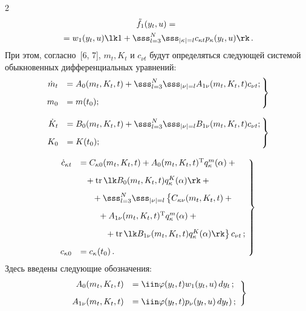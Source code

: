 \begin{multicols}{2}
\noindent
\begin{multline}
\tilde f_1 (y_t, u) ={}\\
{}= w_1 (y_t,u) \lk 1+ \sss_{l=3}^N \sss_{\left\vert\kappa\right\vert=l} 
c_{\kappa t} p_\kappa (y_t,u)\rk\,.\label{e13s}
\end{multline}
При этом, согласно~[6, 7], $m_t, K_t$ и $c_{\nu t}$ будут определяться 
следующей системой обыкновенных дифференциальных уравнений:
\begin{equation}
\left.
\begin{array}{rl}
\!\!\!\!\!\dot m_t &= \displaystyle
A_0 (m_t, K_t, t) + \sss_{l=3}^N \sss_{\left\vert\nu\right\vert=l} 
A_{1\nu}(m_t, K_t, t)  c_{\nu t};\\[9pt] 
\!\!\!\!\!m_0 &= m(t_0);
\end{array}\!\!
\right\}\!\!\!\label{e14s}
\end{equation}

\noindent
\begin{equation}
\left.
\begin{array}{rl}
\!\!\!\!\!\dot K_t &= B_0 (m_t, K_t, t) +\displaystyle \sss_{l=3}^N \sss_{\left\vert\nu\right\vert=l} 
B_{1\nu}(m_t, K_t, t)  c_{\nu t};\\[9pt]
\!\!\!\!\!K_0 &= K(t_0);
\end{array}\!\!
\right\}\!\!\!
\label{e15s}
\end{equation}

\noindent
\begin{equation}
\left.
\begin{array}{rl}
\!\!\!\!\dot c_{\kappa t} &= C_{\kappa 0}  (m_t, K_t, t)+ A_0 (m_t, K_t, t)^{\mathrm{T}} 
q_\kappa^m (\alpha ) +{}\\[9pt]
&\hspace*{2mm}{}+
\mathrm{tr}\, \lk B_0 (m_t, K_t, t) q_\kappa^K (\alpha)\rk+{}\\[8pt]
&\hspace*{5mm}{}+ \displaystyle \sss_{l=3}^N \sss_{\left\vert\nu\right\vert=l} 
\left\{ \vphantom{B_{1v}k_\kappa^K}
C_{\kappa\nu} (m_t, K_t, t)+{}\right.\\[9pt]
&\hspace*{7mm}\left.{}+A_{1\nu}(m_t, K_t, t)^{\mathrm{T}} q_\kappa^m (\alpha) + {}\right.\\[9pt]
&\hspace*{10mm}\left.{}+
\mathrm{tr}\, \lk B_{1\nu} (m_t, K_t, t)q_\kappa^K(\alpha)\rk\right\} c_{\nu t}\,;\\[9pt]
\!\!\!\!c_{\kappa 0}&= c_\kappa(t_0)\,.
\end{array}\!
\right\}\!\!
\label{e16s}
\end{equation}
Здесь введены следующие обозначения:
    \begin{equation}
    \left.
    \begin{array}{rl}
    A_0 (m_t, K_t, t)&= \displaystyle\iin \varphi(y_t, t) w_1 (y_t,u)\, dy_t\,;\\[9pt]
 A_{1\nu} (m_t, K_t, t) &=\displaystyle\iin \varphi (y_t, t) p_\nu (y_t,u)\, d y_t)\,;
 \end{array}
 \right\}
 \label{e16-1s}
 \end{equation}


\end{multicols}
